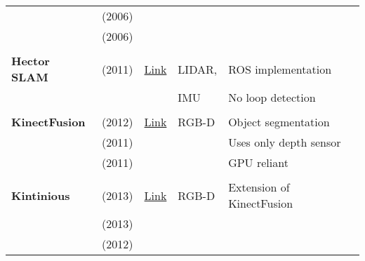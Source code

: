 \documentclass[a4paper,12pt]{scrartcl}
\begin{document}
{\begin{longtable}{l|l|l|l|l}
                           & \cite{Olson2006} (2006)           &                                                                    &                       &\\
                           & \cite{Thrun2006} (2006)           &                                                                    &                       &\\
                           &                                   &                                                                    &                       &\\
    \textbf{Hector SLAM}   & \cite{Kohlbrecher2011} (2011)     & {\href{https://github.com/tu-darmstadt-ros-pkg/hector_slam}{Link}} & LIDAR,                & ROS implementation\\
                           &                                   &                                                                    & IMU                   & No loop detection\\
                           &                                   &                                                                    &                       &\\
    \textbf{KinectFusion}  & \cite{Pirovano2012} (2012)        & {\href{https://github.com/PointCloudLibrary/pcl}{Link}}            & RGB-D                 & Object segmentation\\
                           & \cite{Izadi2011} (2011)           &                                                                    &                       & Uses only depth sensor\\
                           & \cite{Newcombe2011a} (2011)       &                                                                    &                       & GPU reliant\\
                           &                                   &                                                                    &                       &\\
    \textbf{Kintinious}    & \cite{Whelan2013a} (2013)         & {\href{https://github.com/mp3guy/Kintinuous}{Link}}                & RGB-D                 & Extension of KinectFusion\\
                           & \cite{Whelan2013} (2013)          &                                                                    &                       &\\
                           & \cite{Whelan2012} (2012)          &                                                                    &                       &\\

\end{longtable}}
\end{document}
